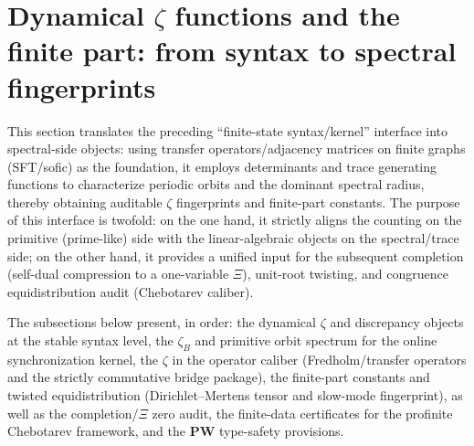 \section{Dynamical \texorpdfstring{$\zeta$}{zeta} functions and the finite part: from syntax to spectral fingerprints}\label{sec:zeta-finite-part}

This section translates the preceding ``finite-state syntax/kernel'' interface into spectral-side objects: using transfer operators/adjacency matrices on finite graphs (SFT/sofic) as the foundation, it employs determinants and trace generating functions to characterize periodic orbits and the dominant spectral radius, thereby obtaining auditable \(\zeta\) fingerprints and finite-part constants. The purpose of this interface is twofold: on the one hand, it strictly aligns the counting on the primitive (prime-like) side with the linear-algebraic objects on the spectral/trace side; on the other hand, it provides a unified input for the subsequent completion (self-dual compression to a one-variable \(\Xi\)), unit-root twisting, and congruence equidistribution audit (Chebotarev caliber).\par
The subsections below present, in order: the dynamical \(\zeta\) and discrepancy objects at the stable syntax level, the \(\zeta_B\) and primitive orbit spectrum for the online synchronization kernel, the \(\zeta\) in the operator caliber (Fredholm/transfer operators and the strictly commutative bridge package), the finite-part constants and twisted equidistribution (Dirichlet--Mertens tensor and slow-mode fingerprint), as well as the completion/\(\Xi\) zero audit, the finite-data certificates for the profinite Chebotarev framework, and the \(\mathbf{PW}\) type-safety provisions.











